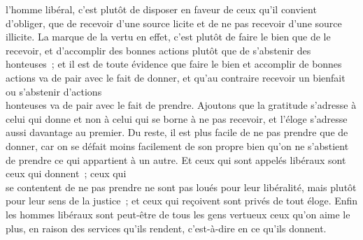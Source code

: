 \documentclass[french,twoside]{book} %
\begin{document}
l’homme libéral, c’est plutôt de disposer en faveur de ceux qu’il convient d’obliger, que de recevoir d’une source licite et de ne pas recevoir d’une source illicite. La marque de la vertu en effet, c’est plutôt de faire le bien que de le recevoir, et d’accomplir des bonnes actions plutôt que de s’abstenir des honteuses ; et il est de toute évidence que faire le bien et accomplir de bonnes actions va de pair avec le fait de donner, et qu’au contraire recevoir un bienfait ou s’abstenir d’actions \\
honteuses va de pair avec le fait de prendre. Ajoutons que la gratitude s’adresse à celui qui donne et non à celui qui se borne à ne pas recevoir, et l’éloge s’adresse aussi davantage au premier. Du reste, il est plus facile de ne pas prendre que de donner, car on se défait moins facilement de son propre bien qu’on ne s’abstient de prendre ce qui appartient à un autre. Et ceux qui sont appelés libéraux sont ceux qui donnent ; ceux qui \\
se contentent de ne pas prendre ne sont pas loués pour leur libéralité, mais plutôt pour leur sens de la justice ; et ceux qui reçoivent sont privés de tout éloge. Enfin les hommes libéraux sont peut-être de tous les gens vertueux ceux qu’on aime le plus, en raison des services qu’ils rendent, c’est-à-dire en ce qu’ils donnent.
\end{document}
